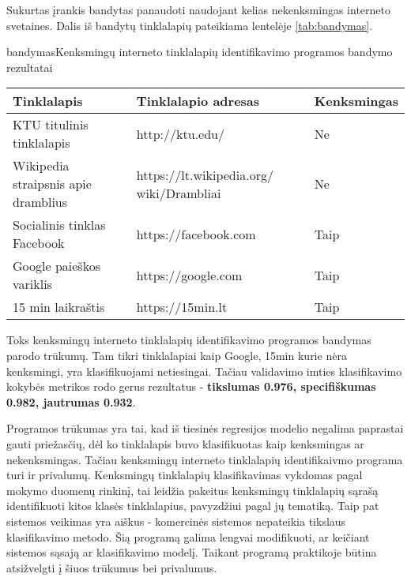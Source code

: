 
Sukurtas įrankis bandytas panaudoti naudojant kelias nekenksmingas interneto svetaines. Dalis iš bandytų
tinklalapių pateikiama lentelėje \vref{tab:bandymas}.

\begin{ktutable}{bandymas}{Kenksmingų interneto tinklalapių identifikavimo programos bandymo rezultatai}
    \begin{tabular}{|p{5 cm}|p{5 cm}|p{3 cm}|}
    \hline
    Tinklalapis & Tinklalapio adresas & Kenksmingas \\ \hline
    KTU titulinis tinklalapis & http://ktu.edu/ & Ne \\ \hline
    Wikipedia straipsnis apie dramblius & https://lt.wikipedia.org/ wiki/Drambliai & Ne \\ \hline
    Socialinis tinklas Facebook & https://facebook.com & Taip \\ \hline
    Google paieškos variklis & https://google.com & Taip \\ \hline
    15 min laikraštis & https://15min.lt & Taip \\ \hline
    \end{tabular}
\end{ktutable}

Toks kenksmingų interneto tinklalapių identifikavimo programos bandymas parodo trūkumų. Tam tikri tinklalapiai kaip Google, 15min kurie nėra kenksmingi,
yra klasifikuojami netiesingai. Tačiau validavimo imties klasifikavimo kokybės metrikos rodo gerus rezultatus - \textbf{tikslumas 0.976, specifiškumas 0.982, jautrumas 0.932}.

Programos trūkumas yra tai, kad iš tiesinės regresijos modelio negalima paprastai gauti priežasčių, dėl ko tinklalapis buvo klasifikuotas kaip kenksmingas ar nekenksmingas. Tačiau kenksmingų interneto tinklalapių identifikaivmo programa turi ir privalumų. Kenksmingų tinklalapių klasifikavimas vykdomas pagal mokymo duomenų rinkinį, tai leidžia pakeitus kenksmingų tinklalapių sąrašą identifikuoti kitos klasės tinklalapius, pavyzdžiui pagal jų tematiką. Taip pat sistemos veikimas yra aiškus - komercinės sistemos nepateikia tikslaus klasifikavimo metodo. Šią programą galima lengvai modifikuoti, ar keičiant sistemos sąsają ar klasifikavimo modelį. Taikant programą praktikoje būtina atsižvelgti į šiuos trūkumus bei privalumus.